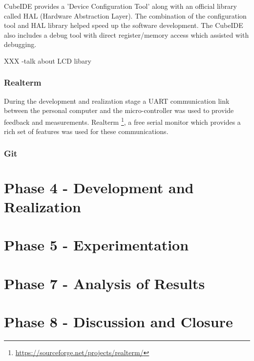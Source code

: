 CubeIDE provides a 'Device Configuration Tool' along with an official library called HAL (Hardware Abstraction Layer). The combination of the configuration tool and HAL library helped speed up the software development. The CubeIDE also includes a debug tool with direct register/memory access which assisted with debugging.

XXX -talk about LCD libary

\subsubsection{Realterm}
During the development and realization stage a UART communication link between the personal computer and the micro-controller was used to provide feedback and measurements. Realterm \footnote{\url{https://sourceforge.net/projects/realterm/}}, a free serial monitor which provides a rich set of features was used for these communications.

\subsubsection{Git}




\section{Phase 4 - Development and Realization}



\section{Phase 5 - Experimentation}



\section{Phase 7 - Analysis of Results}



\section{Phase 8 - Discussion and Closure}








